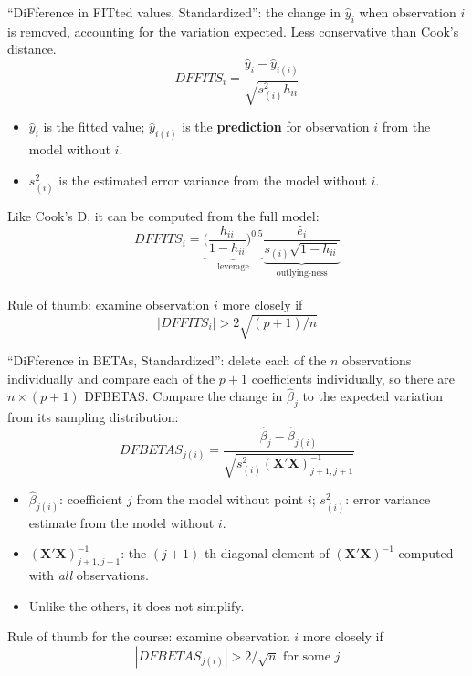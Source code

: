 \begin{definition}
    ``DiFference in FITted values, Standardized'': the change in $\hat y_i$ when observation $i$
    is removed, accounting for the variation expected. Less conservative than Cook's distance.
    \[\boxed{DFFITS_i=\frac{\hat y_i-\hat y_{i(i)}}{\sqrt{s_{(i)}^2h_{ii}}}}\]
    \begin{itemize}
        \item $\hat y_i$ is the fitted value; $\hat y_{i(i)}$ is the \textbf{prediction} for
        observation $i$ from the model without $i$.
        \item $s_{(i)}^2$ is the estimated error variance from the model without $i$.
    \end{itemize}
    Like Cook's D, it can be computed from the full model:
    \[DFFITS_i=\underbrace{\Big(\frac{h_{ii}}{1-h_{ii}}\Big)^{0.5}}_{\text{leverage}}\underbrace{\frac{\hat e_i}{s_{(i)}\sqrt{1-h_{ii}}}}_{\text{outlying-ness}}\]
    \\ Rule of thumb: examine observation $i$ more closely if
    \[\boxed{|DFFITS_i|>2\sqrt{(p+1)/n}}\]
\end{definition}

\begin{definition}
    ``DiFference in BETAs, Standardized'': delete each of the $n$ observations individually and
    compare each of the $p+1$ coefficients individually, so there are $n\times(p+1)$ DFBETAS.
    Compare the change in $\hat\beta_j$ to the expected variation from its sampling distribution:
    \[\boxed{DFBETAS_{j(i)}=\frac{\hat\beta_j-\hat\beta_{j(i)}}{\sqrt{s_{(i)}^2(\mathbf{X}'\mathbf{X})^{-1}_{j+1,j+1}}}}\]
    \begin{itemize}
        \item $\hat\beta_{j(i)}$: coefficient $j$ from the model without point $i$; $s_{(i)}^2$:
        error variance estimate from the model without $i$.
        \item $(\mathbf{X}'\mathbf{X})^{-1}_{j+1,j+1}$: the $(j+1)$-th diagonal element of
        $(\mathbf{X}'\mathbf{X})^{-1}$ computed with \emph{all} observations.
        \item Unlike the others, it does not simplify.
    \end{itemize}
    Rule of thumb for the course: examine observation $i$ more closely if
    \[\boxed{|DFBETAS_{j(i)}|>2/\sqrt n}\text{ for some }j\]
\end{definition}

